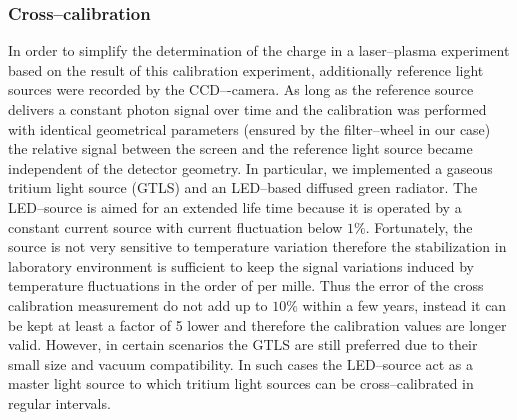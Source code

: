 \documentclass[%
preprint,
amsmath,
amssymb,
aip,
rsi, 
numerical,
floatfix,
]{revtex4-1}
\begin{document}
\subsubsection{\label{Cc}Cross--calibration} 
In order to simplify the determination of the charge in a laser--plasma experiment based on the result of this calibration experiment, additionally reference light sources were recorded by the CCD–-camera. 
As long as the reference source delivers a constant photon signal over time and the calibration was performed with identical geometrical parameters (ensured by the filter--wheel in our case) the relative signal between the screen and the reference light source became independent of the detector geometry.
In particular, we implemented a gaseous tritium light source (GTLS) and an LED--based diffused green radiator.
The LED--source is aimed for an extended life time because it is operated by a constant current source with current fluctuation below $1\%$.
Fortunately, the source is not very sensitive to temperature variation therefore the stabilization in laboratory environment is sufficient to keep the signal variations induced by temperature fluctuations in the order of per mille.  
Thus the error of the cross calibration measurement do not add up to $10\%$ within a few years, instead it can be kept at least a factor of 5 lower and therefore the calibration values are longer valid.
However, in certain scenarios the GTLS are still preferred due to their small size and vacuum compatibility.
In such cases the LED--source act as a master light source to which tritium light sources can be cross--calibrated in regular intervals.
\end{document}
